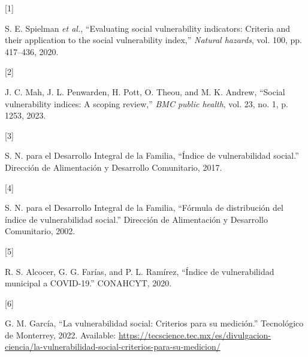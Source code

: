 \documentclass[
  letterpaper,
  DIV=11,
  numbers=noendperiod]{scrreprt}
\newlength{\cslhangindent}
\newlength{\csllabelwidth}
\newenvironment{CSLReferences}[2] %
 {\begin{list}{}{%
  \setlength{\itemindent}{0pt}
  \setlength{\leftmargin}{0pt}
  \setlength{\parsep}{0pt}
  \ifodd #1
   \setlength{\leftmargin}{\cslhangindent}
   \setlength{\itemindent}{-1\cslhangindent}
  \fi
  \setlength{\itemsep}{#2\baselineskip}}}
 {\end{list}}
\newcommand{\CSLLeftMargin}[1]{\parbox[t]{\csllabelwidth}{\strut#1\strut}}
\newcommand{\CSLRightInline}[1]{\parbox[t]{\linewidth - \csllabelwidth}{\strut#1\strut}}
\begin{document}
\label{refs}
\begin{CSLReferences}{0}{0}
\CSLLeftMargin{{[}1{]} }%
\CSLRightInline{S. E. Spielman \emph{et al.}, {``Evaluating social
vulnerability indicators: Criteria and their application to the social
vulnerability index,''} \emph{Natural hazards}, vol. 100, pp. 417--436,
2020.}

\CSLLeftMargin{{[}2{]} }%
\CSLRightInline{J. C. Mah, J. L. Penwarden, H. Pott, O. Theou, and M. K.
Andrew, {``Social vulnerability indices: A scoping review,''} \emph{BMC
public health}, vol. 23, no. 1, p. 1253, 2023.}

\CSLLeftMargin{{[}3{]} }%
\CSLRightInline{S. N. para el Desarrollo Integral de la Familia,
{``Índice de vulnerabilidad social.''} Dirección de Alimentación y
Desarrollo Comunitario, 2017.}

\CSLLeftMargin{{[}4{]} }%
\CSLRightInline{S. N. para el Desarrollo Integral de la Familia,
{``Fórmula de distribución del índice de vulnerabilidad social.''}
Dirección de Alimentación y Desarrollo Comunitario, 2002.}

\CSLLeftMargin{{[}5{]} }%
\CSLRightInline{R. S. Alcocer, G. G. Farías, and P. L. Ramírez,
{``Índice de vulnerabilidad municipal a COVID-19.''} CONAHCYT, 2020.}

\CSLLeftMargin{{[}6{]} }%
\CSLRightInline{G. M. García, {``La vulnerabilidad social: Criterios
para su medición.''} Tecnológico de Monterrey, 2022. Available:
\url{https://tecscience.tec.mx/es/divulgacion-ciencia/la-vulnerabilidad-social-criterios-para-su-medicion/}}

\end{CSLReferences}
\end{document}
